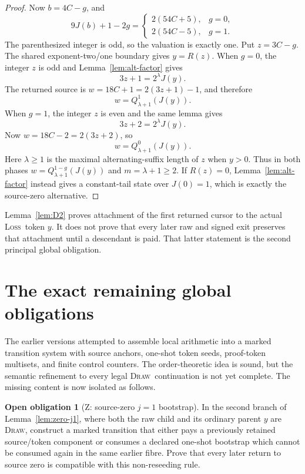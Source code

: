 \documentclass[11pt,a4paper]{article}
\theoremstyle{definition}
\newtheorem{obligation}[theorem]{Open obligation}
\theoremstyle{remark}
\newcommand{\LOSS}{\textnormal{\textsc{Loss}}}
\newcommand{\DRAW}{\textnormal{\textsc{Draw}}}
\begin{document}
\begin{proof}
Now $b=4C-g$, and
\[
 9J(b)+1-2g=
 \begin{cases}
  2(54C+5),&g=0,\\
  2(54C-5),&g=1.
 \end{cases}
\]
The parenthesized integer is odd, so the valuation is exactly one.  Put
$z=3C-g$.  The shared exponent-two/one boundary gives $y=R(z)$.
When $g=0$, the integer $z$ is odd and
Lemma~\ref{lem:alt-factor} gives
\[
  3z+1=2^\lambda J(y).
\]
The returned source is $w=18C+1=2(3z+1)-1$, and therefore
\[
  w=Q_{\lambda+1}^{1}(J(y)).
\]
When $g=1$, the integer $z$ is even and the same lemma gives
\[
  3z+2=2^\lambda J(y).
\]
Now $w=18C-2=2(3z+2)$, so
\[
  w=Q_{\lambda+1}^{0}(J(y)).
\]
Here $\lambda\ge1$ is the maximal alternating-suffix length of $z$ when
$y>0$.  Thus in both phases
$w=Q_{\lambda+1}^{1-g}(J(y))$ and $m=\lambda+1\ge2$.  If $R(z)=0$,
Lemma~\ref{lem:alt-factor} instead gives a constant-tail state over
$J(0)=1$, which is exactly the source-zero alternative.
\end{proof}

Lemma~\ref{lem:D2} proves attachment of the first returned cursor to the
actual \LOSS\ token $y$.  It does not prove that every later raw and signed
exit preserves that attachment until a descendant is paid.  That latter
statement is the second principal global obligation.

\section{The exact remaining global obligations}

The earlier versions attempted to assemble local arithmetic into a marked
transition system with source anchors, one-shot token seeds, proof-token
multisets, and finite control counters.  The order-theoretic idea is sound,
but the semantic refinement to every legal \DRAW\ continuation is not yet
complete.  The missing content is now isolated as follows.

\begin{obligation}[Z: source-zero $j=1$ bootstrap]\label{obl:Z}
In the second branch of Lemma~\ref{lem:zero-j1}, where both the raw child and
its ordinary parent $y$ are \DRAW, construct a marked transition that either
pays a previously retained source/token component or consumes a declared
one-shot bootstrap which cannot be consumed again in the same earlier
fibre.  Prove that every later return to source zero is compatible with this
non-reseeding rule.
\end{obligation}
\end{document}
